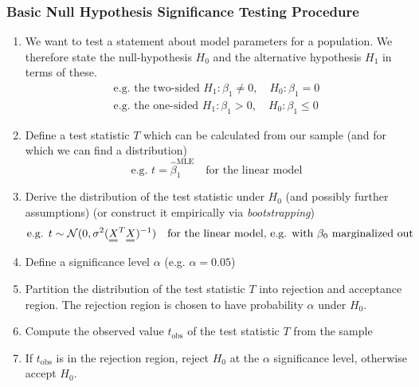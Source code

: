 \subsubsection{Basic Null Hypothesis Significance Testing Procedure}
\begin{enumerate}
    \item We want to test a statement about model parameters for a population. We therefore state the null-hypothesis
    $H_0$ and the alternative hypothesis $H_1$ in terms of these.
    \begin{equation}
        \begin{gathered}
            \text{e.g. the two-sided } H_1: \beta_1 \neq 0, \quad H_0: \beta_1 = 0 \\
            \text{e.g. the one-sided } H_1: \beta_1 > 0, \quad H_0: \beta_1 \leq 0
        \end{gathered}
    \end{equation}
    \item Define a test statistic $T$ which can be calculated from our sample (and for which we can find a distribution)
    \begin{equation}
        \text{e.g. } t=\hat{\beta}_1^\text{MLE} \quad \text{for the linear model}
    \end{equation}
    \item Derive the distribution of the test statistic under $H_0$ (and possibly further assumptions) (or construct it empirically via \textit{bootstrapping})
    \begin{equation}
        \text{e.g. } t \sim \mathcal{N}(0,\sigma^2 (\mat{X}^T \mat{X})^{-1}) \quad \text{for the linear model, e.g. with } \beta_0 \text{ marginalized out}
    \end{equation}
    \item Define a significance level $\alpha$ (e.g. $\alpha = 0.05$)
    \item Partition the distribution of the test statistic $T$ into rejection and acceptance region. The rejection region is
    chosen to have probability $\alpha$ under $H_0$.
    \item Compute the observed value $t_{\text{obs}}$ of the test statistic $T$ from the sample
    \item If $t_{\text{obs}}$ is in the rejection region, reject $H_0$ at the $\alpha$ significance level, otherwise accept $H_0$.
\end{enumerate}
